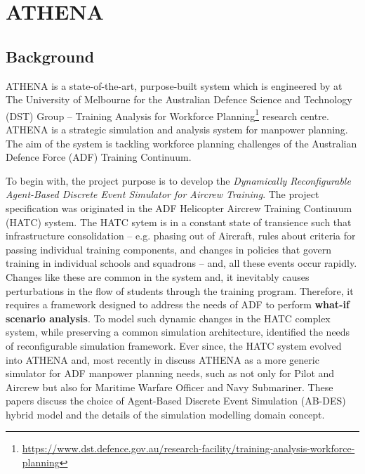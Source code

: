 \chapter{ATHENA} 

\label{Chapter2}

\section{Background}

ATHENA is a state-of-the-art, purpose-built system which is engineered by \textit{\groupname} at The University of Melbourne for the Australian Defence Science and Technology (DST) Group -- Training Analysis for Workforce Planning\footnote{\url{https://www.dst.defence.gov.au/research-facility/training-analysis-workforce-planning}} research centre. ATHENA is a strategic simulation and analysis system for manpower planning. The aim of the system is tackling workforce planning challenges of the Australian Defence Force (ADF) Training Continuum. 

To begin with, the project purpose is to develop the \textit{Dynamically Reconfigurable Agent-Based Discrete Event Simulator for Aircrew Training}. The project specification was originated in the ADF Helicopter Aircrew Training Continuum (HATC) system. The HATC\parencite{HATC} sytem is in a constant state of transience such that infrastructure consolidation -- e.g. phasing out of Aircraft, rules about criteria for passing individual training components, and changes in policies that govern training in individual schools and squadrons -- and, all these events occur rapidly. Changes like these are common in the system and, it inevitably causes perturbations in the flow of students through the training program. Therefore, it requires a framework designed to address the needs of ADF to perform \textbf{what-if scenario analysis}. To model such dynamic changes in the HATC complex system, while preserving a common simulation architecture, \parencite{HATC} identified the needs of reconfigurable simulation framework. Ever since, the HATC system evolved into ATHENA and, most recently in \parencite{8248116} discuss ATHENA as a more generic simulator for ADF manpower planning needs, such as not only for Pilot and Aircrew but also for Maritime Warfare Officer and Navy Submariner.
These papers discuss the choice of Agent-Based Discrete Event Simulation (AB-DES) hybrid model and the details of the simulation modelling domain concept.

